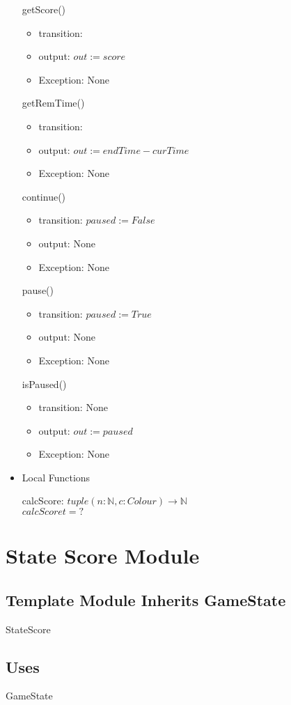 \documentclass[11pt]{article}
\begin{document}
\begin{itemize}
getScore()
\begin{itemize}
\item transition:
\item output: \(out := score\)
\item Exception: None
\end{itemize}

getRemTime()
\begin{itemize}
\item transition:
\item output: \(out := endTime - curTime\)
\item Exception: None
\end{itemize}

continue()
\begin{itemize}
\item transition: \(paused := False\)
\item output: None
\item Exception: None
\end{itemize}

pause()
\begin{itemize}
\item transition: \(paused := True\)
\item output: None
\item Exception: None
\end{itemize}

isPaused()
\begin{itemize}
\item transition: None
\item output: \(out := paused\)
\item Exception: None
\end{itemize}

\item Local Functions
\label{sec:org5c93abc}

calcScore: \(tuple(n: \mathbb{N}, c: Colour) \rightarrow \mathbb{N}\) \\
\(calcScore t = ?\)
\end{itemize}
\section{State Score Module}
\label{sec:org51ba18a}
\subsection*{Template Module Inherits GameState}
\label{sec:org8626688}
StateScore
\subsection*{Uses}
\label{sec:org8195ac6}
GameState
\end{document}
